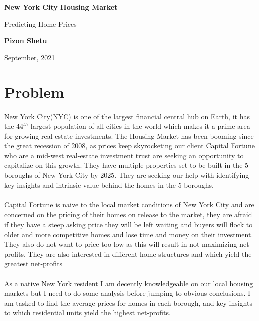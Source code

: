\documentclass{article}
\begin{document}
\begin{titlepage}
   \begin{center}
       \vspace*{0.5cm}

       \textbf{New York City Housing Market}

       \vspace{0.5cm}
        Predicting Home Prices

       \vspace{0.5cm}

       \textbf{Pizon Shetu}

       \vspace{0.5cm}

       September, 2021
   \end{center}

\tableofcontents
\clearpage
\section{Problem}
    New York City(NYC) is one of the largest financial central hub on Earth, it has the 44$^{th}$ largest population of all cities in the world which makes it a prime area for growing real-estate investments. The Housing Market has been booming since the great recession of 2008, as prices keep skyrocketing our client Capital Fortune who are a mid-west real-estate investment trust are seeking an opportunity to capitalize on this growth. They have multiple properties set to be built in the 5 boroughs of New York City by 2025. They are seeking our help with identifying key insights and intrinsic value behind the homes in the 5 boroughs.  \\
    \\
    Capital Fortune is naive to the local market conditions of New York City and are concerned on the pricing of their homes on release to the market, they are afraid if they have a steep asking price they will be left waiting and buyers will flock to older and more competitive homes and lose time and money on their investment. They also do not want to price too low as this will result in not maximizing net-profits. They are also interested in different home structures and which yield the greatest net-profits \\
    \\
    As a native New York resident I am decently knowledgeable on our local housing markets but I need to do some analysis before jumping to obvious conclusions. I am tasked to find the average prices for homes in each borough, and key insights to which residential units yield the highest net-profits. \\


\end{titlepage}
\end{document}
